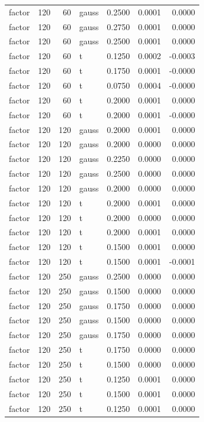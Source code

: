 \begin{tabular}{lrrlrrr}
factor & 120 & 60 & gauss & 0.2500 & 0.0001 & 0.0000 \\
factor & 120 & 60 & gauss & 0.2750 & 0.0001 & 0.0000 \\
factor & 120 & 60 & gauss & 0.2500 & 0.0001 & 0.0000 \\
factor & 120 & 60 & t & 0.1250 & 0.0002 & -0.0003 \\
factor & 120 & 60 & t & 0.1750 & 0.0001 & -0.0000 \\
factor & 120 & 60 & t & 0.0750 & 0.0004 & -0.0000 \\
factor & 120 & 60 & t & 0.2000 & 0.0001 & 0.0000 \\
factor & 120 & 60 & t & 0.2000 & 0.0001 & -0.0000 \\
factor & 120 & 120 & gauss & 0.2000 & 0.0001 & 0.0000 \\
factor & 120 & 120 & gauss & 0.2000 & 0.0000 & 0.0000 \\
factor & 120 & 120 & gauss & 0.2250 & 0.0000 & 0.0000 \\
factor & 120 & 120 & gauss & 0.2500 & 0.0000 & 0.0000 \\
factor & 120 & 120 & gauss & 0.2000 & 0.0000 & 0.0000 \\
factor & 120 & 120 & t & 0.2000 & 0.0001 & 0.0000 \\
factor & 120 & 120 & t & 0.2000 & 0.0000 & 0.0000 \\
factor & 120 & 120 & t & 0.2000 & 0.0001 & 0.0000 \\
factor & 120 & 120 & t & 0.1500 & 0.0001 & 0.0000 \\
factor & 120 & 120 & t & 0.1500 & 0.0001 & -0.0001 \\
factor & 120 & 250 & gauss & 0.2500 & 0.0000 & 0.0000 \\
factor & 120 & 250 & gauss & 0.1500 & 0.0000 & 0.0000 \\
factor & 120 & 250 & gauss & 0.1750 & 0.0000 & 0.0000 \\
factor & 120 & 250 & gauss & 0.1500 & 0.0000 & 0.0000 \\
factor & 120 & 250 & gauss & 0.1750 & 0.0000 & 0.0000 \\
factor & 120 & 250 & t & 0.1750 & 0.0000 & 0.0000 \\
factor & 120 & 250 & t & 0.1500 & 0.0000 & 0.0000 \\
factor & 120 & 250 & t & 0.1250 & 0.0001 & 0.0000 \\
factor & 120 & 250 & t & 0.1500 & 0.0001 & 0.0000 \\
factor & 120 & 250 & t & 0.1250 & 0.0001 & 0.0000 \\

\end{tabular}
